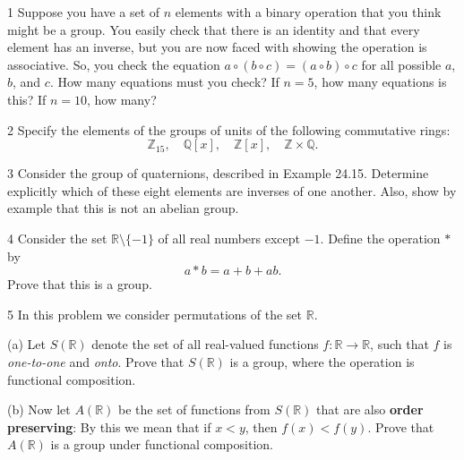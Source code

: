 \begin{problem}{1}
    Suppose you have a set of $n$ elements with a binary operation that you think might
    be a group. You easily check that there is an identity and that every element has an
    inverse, but you are now faced with showing the operation is associative. So, you
    check the equation $a \circ (b \circ c) = (a \circ b) \circ c$ for all possible $a$,
    $b$, and $c$. How many equations must you check? If $n = 5$, how many equations is
    this? If $n = 10$, how many?
\end{problem}
\unsolved

\begin{problem}{2}
    Specify the elements of the groups of units of the following commutative rings:
    \[\mathbb{Z}_{15}, \quad \mathbb{Q}[x], \quad \mathbb{Z}[x], \quad \mathbb{Z} \times \mathbb{Q}.\]
\end{problem}
\unsolved

\begin{problem}{3}
    Consider the group of quaternions, described in Example 24.15. Determine explicitly
    which of these eight elements are inverses of one another. Also, show by example that
    this is not an abelian group.
\end{problem}
\unsolved

\begin{problem}{4}
    Consider the set $\mathbb{R} \setminus \{-1\}$ of all real numbers except $-1$. Define
    the operation $*$ by
    \[a * b = a + b + ab.\]
    Prove that this is a group.
\end{problem}
\unsolved

\begin{problem}{5}
    In this problem we consider permutations of the set $\mathbb{R}$.

    (a) Let $S(\mathbb{R})$ denote the set of all real-valued functions 
    $f : \mathbb{R} \longrightarrow \mathbb{R}$, such that $f$ is 
    \emph{one-to-one} and \emph{onto}. Prove that $S(\mathbb{R})$ is 
    a group, where the operation is functional composition.

    (b) Now let $A(\mathbb{R})$ be the set of functions from 
    $S(\mathbb{R})$ that are also \textbf{order preserving}: By 
    this we mean that if $x < y$, then $f(x) < f(y)$. Prove that 
    $A(\mathbb{R})$ is a group under functional composition.
\end{problem}
\solved

